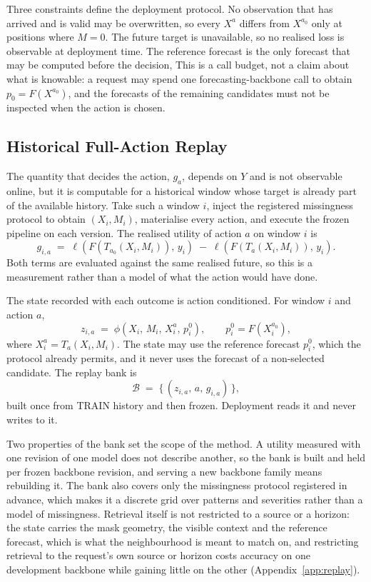 \documentclass{article}
\newcommand{\calB}{\mathcal{B}}
\newcommand{\loss}{\ell}
\begin{document}
Three constraints define the deployment protocol. No observation that has arrived and is valid
may be overwritten, so every $X^{a}$ differs from $X^{a_0}$ only at positions where $M = 0$.
The future target is unavailable, so no realised loss is observable at deployment time. The
reference forecast is the only forecast that may be computed before the decision, This is a
call budget, not a claim about what is knowable: a request may spend one
forecasting-backbone call to obtain $p_0 = F(X^{a_0})$, and the forecasts of the remaining
candidates must not be inspected when the action is chosen.

\subsection{Historical Full-Action Replay}
\label{sec:method-replay}
The quantity that decides the action, $g_a$, depends on $Y$ and is not observable online, but it
is computable for a historical window whose target is already part of the available history.
Take such a window $i$, inject the registered missingness protocol to obtain $(X_i, M_i)$,
materialise every action, and execute the frozen pipeline on each version. The realised utility
of action $a$ on window $i$ is
\begin{equation}
  g_{i,a} \;=\; \loss\!\left(F(T_{a_0}(X_i, M_i)),\, y_i\right)
  \;-\; \loss\!\left(F(T_{a}(X_i, M_i)),\, y_i\right).
  \label{eq:replay-gain}
\end{equation}
Both terms are evaluated against the same realised future, so this is a measurement rather
than a model of what the action would have done.

The state recorded with each outcome is action conditioned. For window $i$ and action $a$,
\begin{equation}
  z_{i,a} \;=\; \phi\!\left(X_i,\, M_i,\, X_i^{a},\, p_i^{0}\right),
  \qquad
  p_i^{0} = F(X_i^{a_0}),
  \label{eq:state}
\end{equation}
where $X_i^{a} = T_a(X_i, M_i)$. The state may use the reference forecast $p_i^0$, which the
protocol already permits, and it never uses the forecast of a non-selected candidate. The
replay bank is
\begin{equation}
  \calB \;=\; \bigl\{\, (z_{i,a},\, a,\, g_{i,a}) \,\bigr\},
  \label{eq:replay-bank}
\end{equation}
built once from TRAIN history and then frozen. Deployment reads it and never writes to it.

Two properties of the bank set the scope of the method. A utility measured with one revision
of one model does not describe another, so the bank is built and held per frozen backbone
revision, and serving a new backbone family means rebuilding it. The bank also covers only the
missingness protocol registered in advance, which makes it a discrete grid over patterns and
severities rather than a model of missingness. Retrieval itself is not restricted to a source
or a horizon: the state carries the mask geometry, the visible context and the reference
forecast, which is what the neighbourhood is meant to match on, and restricting retrieval to
the request's own source or horizon costs accuracy on one development backbone while gaining
little on the other (Appendix~\ref{app:replay}).
\end{document}

